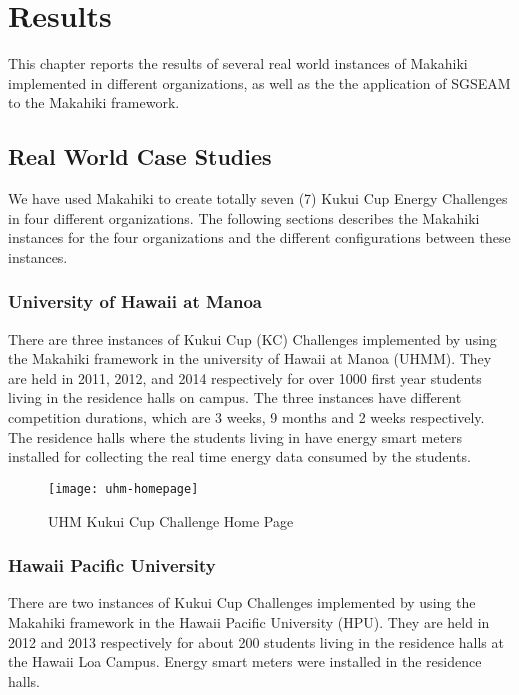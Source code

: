 \chapter{Results}
\label{cha:results}

This chapter reports the results of several real world instances of Makahiki implemented in different organizations, as well as the the application of SGSEAM to the Makahiki framework.

\section{Real World Case Studies}

We have used Makahiki to create totally seven (7) Kukui Cup Energy Challenges in four different organizations. The following sections describes the Makahiki instances for the four organizations and the different configurations between these instances.

\subsection{University of Hawaii at Manoa}

There are three instances of Kukui Cup (KC) Challenges implemented by using the Makahiki framework in the university of Hawaii at Manoa (UHMM). They are held in 2011, 2012, and 2014 respectively for over 1000 first year students living in the residence halls on campus. The three instances have different competition durations, which are 3 weeks, 9 months and 2 weeks respectively. The residence halls where the students living in have energy smart meters installed for collecting the real time energy data consumed by the students. 

\begin{figure}[ht!]
   \centering
   \texttt{[image: uhm-homepage]}
   \caption{UHM Kukui Cup Challenge Home Page}
   \label{fig:uhm-homepage}
\end{figure}

\subsection{Hawaii Pacific University}

There are two instances of Kukui Cup Challenges implemented by using the Makahiki framework in the Hawaii Pacific University (HPU). They are held in 2012 and 2013 respectively for about 200 students living in the residence halls at the Hawaii Loa Campus. Energy smart meters were installed in the residence halls.

